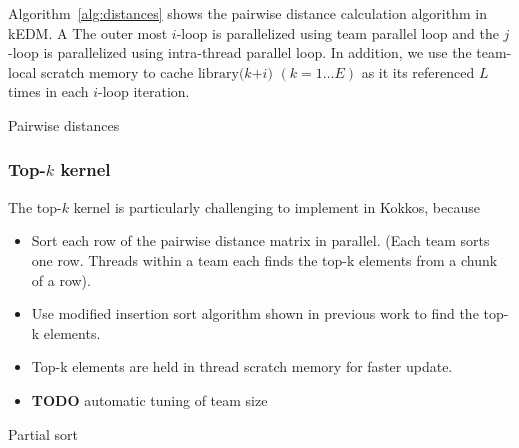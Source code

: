 \documentclass[conference]{IEEEtran}
\begin{document}
Algorithm~\ref{alg:distances} shows the pairwise distance calculation algorithm
in kEDM\@. A The outer most $i$-loop is parallelized using team parallel loop and
the $j$-loop is parallelized using intra-thread parallel loop. In addition, we
use the team-local scratch memory to cache $\mathrm{library}(k $\texttau$ + i)$
$(k=1 \dots E)$ as it its referenced $L$ times in each $i$-loop iteration.

\begin{algorithm}
    \SetAlgoLined
    \DontPrintSemicolon
    \caption{Pairwise distances}%
    \label{alg:distances}
\end{algorithm}

\subsubsection{Top-$k$ kernel}

The top-$k$ kernel is particularly challenging to implement in Kokkos, because


\begin{itemize}
\item Sort each row of the pairwise distance matrix in parallel. (Each team sorts one row. Threads within a team each finds the top-k elements from a chunk of a row).
\item Use modified insertion sort algorithm shown in previous work to find the top-k elements.
\item Top-k elements are held in thread scratch memory for faster update.
\item \textbf{TODO} automatic tuning of team size
\end{itemize}

\begin{algorithm}
    \SetAlgoLined
    \DontPrintSemicolon
    \caption{Partial sort}%
    \label{alg:sort}
\end{algorithm}
\end{document}
